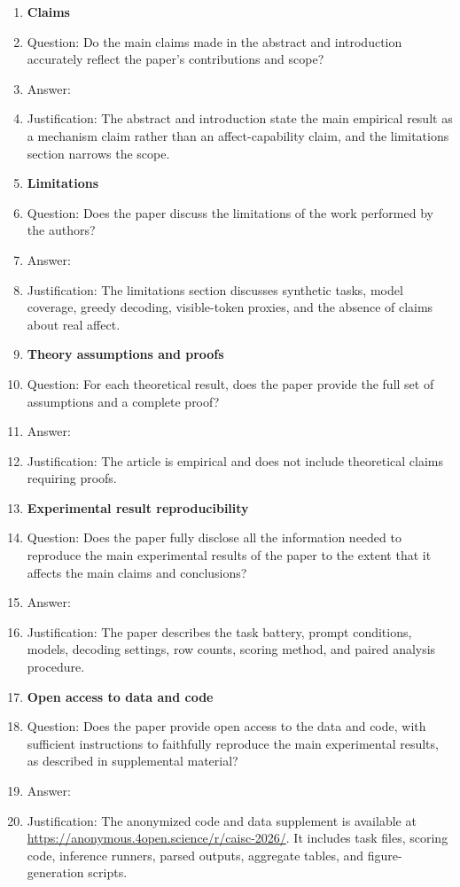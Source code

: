 \documentclass{article}
\begin{document}
\begin{enumerate}
    \item {\bf Claims}
    \item[] Question: Do the main claims made in the abstract and introduction accurately reflect the paper's contributions and scope?
    \item[] Answer: \answerYes{}
    \item[] Justification: The abstract and introduction state the main empirical result as a mechanism claim rather than an affect-capability claim, and the limitations section narrows the scope.

    \item {\bf Limitations}
    \item[] Question: Does the paper discuss the limitations of the work performed by the authors?
    \item[] Answer: \answerYes{}
    \item[] Justification: The limitations section discusses synthetic tasks, model coverage, greedy decoding, visible-token proxies, and the absence of claims about real affect.

    \item {\bf Theory assumptions and proofs}
    \item[] Question: For each theoretical result, does the paper provide the full set of assumptions and a complete proof?
    \item[] Answer: \answerNA{}
    \item[] Justification: The article is empirical and does not include theoretical claims requiring proofs.

    \item {\bf Experimental result reproducibility}
    \item[] Question: Does the paper fully disclose all the information needed to reproduce the main experimental results of the paper to the extent that it affects the main claims and conclusions?
    \item[] Answer: \answerYes{}
    \item[] Justification: The paper describes the task battery, prompt conditions, models, decoding settings, row counts, scoring method, and paired analysis procedure.

    \item {\bf Open access to data and code}
    \item[] Question: Does the paper provide open access to the data and code, with sufficient instructions to faithfully reproduce the main experimental results, as described in supplemental material?
    \item[] Answer: \answerYes{}
    \item[] Justification: The anonymized code and data supplement is available at \url{https://anonymous.4open.science/r/caisc-2026/}. It includes task files, scoring code, inference runners, parsed outputs, aggregate tables, and figure-generation scripts.


\end{enumerate}
\end{document}
